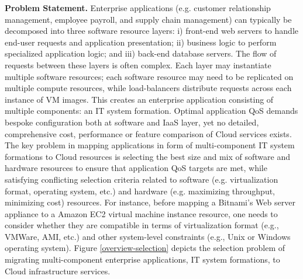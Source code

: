 \documentclass[10pt]{article}
\begin{document}
\textbf{Problem Statement.} Enterprise applications (e.g. customer relationship management, employee payroll, and supply chain management) can typically be decomposed into three software resource layers: i) front-end web servers to handle end-user requests and application presentation; ii) business logic to perform specialized application logic; and iii) back-end database servers. The flow of requests between these layers is often complex. Each layer may instantiate multiple software resources; each software resource may need to be replicated on multiple compute resources, while load-balancers distribute requests across each instance of VM images. This creates an enterprise application consisting of multiple components: an IT system formation. Optimal application QoS demands bespoke configuration both at software and IaaS layer, yet no detailed, comprehensive cost, performance or feature comparison of Cloud services exists. The key problem in mapping applications in form of multi-component IT system formations to Cloud resources is selecting the best size and mix of software and hardware resources to ensure that application QoS targets are met, while satisfying conflicting selection criteria \cite{SPE:SPE1110} related to software (e.g. virtualization format, operating system, etc.) and hardware (e.g. maximizing throughput, minimizing cost) resources. For instance, before mapping a Bitnami's Web server appliance \cite{bitnami2011} to a Amazon EC2\cite{awsec22011} virtual machine instance resource, one needs to consider whether they are compatible in terms of virtualization format (e.g., VMWare, AMI, etc.) and other system-level constraints (e.g., Unix or Windows operating system).
Figure \ref{overview-selection} depicts the selection problem of migrating multi-component enterprise applications, IT system formations, to Cloud infrastructure services.
\end{document}
